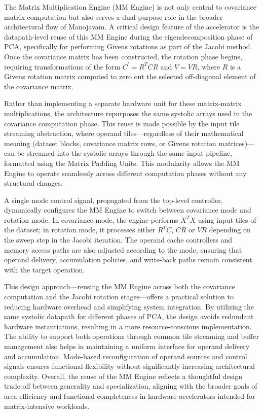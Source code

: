 The Matrix Multiplication Engine (MM Engine) is not only central to covariance matrix computation but also serves a dual-purpose role in the broader architectural flow of Manojavam. A critical design feature of the accelerator is the datapath-level reuse of this MM Engine during the eigendecomposition phase of PCA, specifically for performing Givens rotations as part of the Jacobi method. Once the covariance matrix has been constructed, the rotation phase begins, requiring transformations of the form $C^{'} = R^{T}CR$ and $V=VR$, where $R$ is a Givens rotation matrix computed to zero out the selected off-diagonal element of the covariance matrix.

Rather than implementing a separate hardware unit for these matrix-matrix multiplications, the architecture repurposes the same systolic arrays used in the covariance computation phase. This reuse is made possible by the input tile streaming abstraction, where operand tiles—regardless of their mathematical meaning (dataset blocks, covariance matrix rows, or Givens rotation matrices)—can be streamed into the systolic arrays through the same input pipeline, formatted using the Matrix Padding Units. This modularity allows the MM Engine to operate seamlessly across different computation phases without any structural changes.

A single mode control signal, propagated from the top-level controller, dynamically configures the MM Engine to switch between covariance mode and rotation mode. In covariance mode, the engine performs $X^{T}X$ using input tiles of the dataset; in rotation mode, it processes either $R^{T}C$, $CR$ or $VR$ depending on the sweep step in the Jacobi iteration. The operand cache controllers and memory access paths are also adjusted according to the mode, ensuring that operand delivery, accumulation policies, and write-back paths remain consistent with the target operation.

This design approach—reusing the MM Engine across both the covariance computation and the Jacobi rotation stages—offers a practical solution to reducing hardware overhead and simplifying system integration. By utilizing the same systolic datapath for different phases of PCA, the design avoids redundant hardware instantiations, resulting in a more resource-conscious implementation. The ability to support both operations through common tile streaming and buffer management also helps in maintaining a uniform interface for operand delivery and accumulation. Mode-based reconfiguration of operand sources and control signals ensures functional flexibility without significantly increasing architectural complexity. Overall, the reuse of the MM Engine reflects a thoughtful design trade-off between generality and specialization, aligning with the broader goals of area efficiency and functional completeness in hardware accelerators intended for matrix-intensive workloads. 

